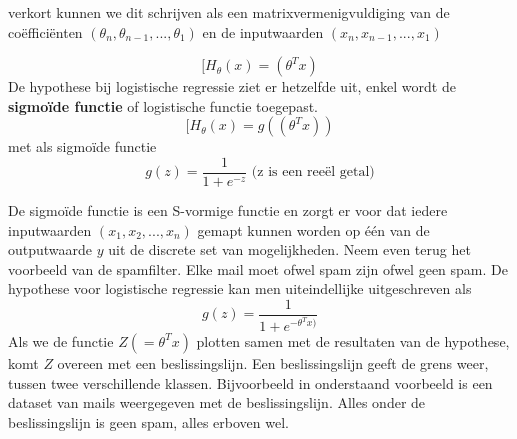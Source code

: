 verkort kunnen we dit schrijven als een matrixvermenigvuldiging van de co\"effici\"enten $(\theta_{n},\theta_{n-1},...,\theta_{1})$ en de inputwaarden $(x_{n},x_{n-1},...,x_{1})$

\[ [H_{\theta}(x) = (\theta^{T}x)\] 
%
De hypothese bij logistische regressie ziet er hetzelfde uit, enkel wordt de \textbf{sigmo\"ide functie} of logistische functie toegepast.
\[ [H_{\theta}(x) = g((\theta^{T}x))\]
%
met als sigmo\"ide functie
%
\[g(z) = \frac{1}{1 + e^{-z}}  \text{  (z is een ree\"el getal)} \]

\newline
\begin{figure}[h]
\centering
{}
\end{figure}
\newline

De sigmo\"ide functie is een S-vormige functie en zorgt er voor dat iedere inputwaarden $(x_{1}, x_{2} , ... , x_{n})$ gemapt kunnen worden op \'e\'en van de outputwaarde $y$ uit de discrete set van mogelijkheden. Neem even terug het voorbeeld van de spamfilter. Elke mail moet ofwel spam zijn ofwel geen spam. De hypothese voor logistische regressie kan men uiteindellijke uitgeschreven als
%
\[g(z) = \frac{1}{1 + e^{-\theta^{T}x)}} \]
%
Als we de functie $Z (= \theta^{T}x)$ plotten samen met de resultaten van de hypothese, komt $Z$ overeen met een beslissingslijn. Een beslissingslijn geeft de grens weer, tussen twee verschillende klassen. 
Bijvoorbeeld in onderstaand voorbeeld is een dataset van mails weergegeven met de beslissingslijn. Alles onder de beslissingslijn is geen spam, alles erboven wel. \\

